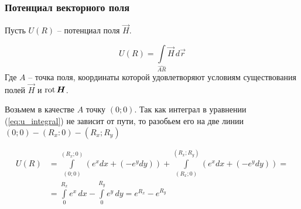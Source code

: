 \begin{frame}\frametitle{Потенциал векторного поля}
  Пусть \(U(R)\) -- потенциал поля \(\vec H\).
  
  \begin{equation}
      U(R) =
      \int\limits_{\widehat{AR}} \vec H \, d \vec r
    \label{eq:u_integral}
  \end{equation}
  Где $A$ -- точка поля, координаты которой удовлетворяют условиям
  существования полей $\vec H$ и $\rot \vec H$.

  Возьмем в качестве $A$ точку $(0; 0)$.
  Так как интеграл в уравнении (\ref{eq:u_integral}) не зависит от пути,
  то разобьем его на две линии $(0; 0) - (R_x: 0) - (R_x; R_y)$

  \begin{align}
    U(R) &= \int\limits_{(0; 0)}^{(R_x; 0)} \left(e^x dx + (-e^y dy) \right) +
    \int\limits_{(R_x; 0)}^{(R_x; R_y)} \left(e^x dx + (-e^y dy) \right) = \\
         &=
    \int\limits_{0}^{R_x} e^x \, dx - \int\limits_{0}^{R_y} e^y \, dy =
    e^{R_x} - e^{R_y}
    \label{eq:}
  \end{align}
	
\end{frame}
